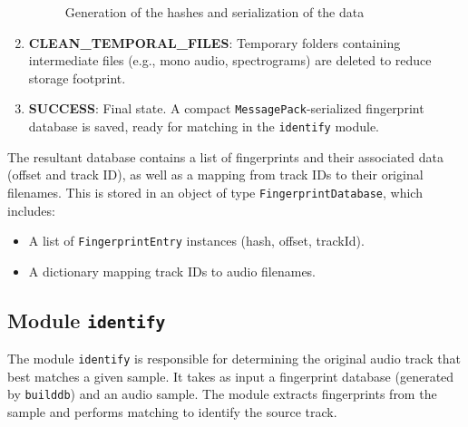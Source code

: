 \documentclass[11pt, a4paper]{article}
\begin{document}
\begin{enumerate}
\begin{figure}[H]
            \caption{Generation of the hashes and serialization of the data}
            \label{fig:generate_hashes}
        \end{figure}
        \item \textbf{CLEAN\_TEMPORAL\_FILES}: Temporary folders containing intermediate files (e.g., mono audio, spectrograms) are deleted to reduce storage footprint.
        \item \textbf{SUCCESS}: Final state. A compact \texttt{MessagePack}-serialized fingerprint database is saved, ready for matching in the \texttt{identify} module.
    \end{enumerate}
    
    The resultant database contains a list of fingerprints and their associated data (offset and track ID), as well as a mapping from track IDs to their original filenames. This is stored in 
    an object of type \texttt{FingerprintDatabase}, which includes:
        \begin{itemize}
            \item A list of \texttt{FingerprintEntry} instances (hash, offset, trackId).
            \item A dictionary mapping track IDs to audio filenames.
        \end{itemize}

    \subsection{Module \texttt{identify}}

    The module \texttt{identify} is responsible for determining the original audio track that best matches a given sample. It takes as input a fingerprint database 
    (generated by \texttt{builddb}) and an audio sample. The module extracts fingerprints from the sample and performs matching to identify the source track.
\end{document}
